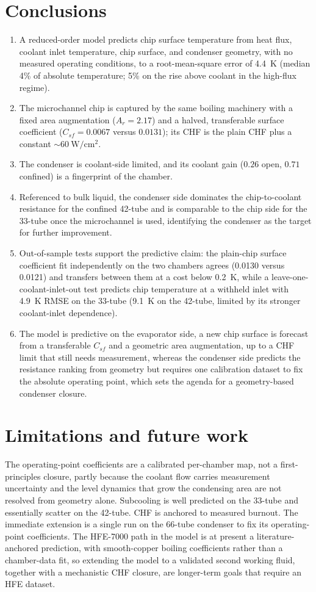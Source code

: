 \documentclass[11pt]{article}
\begin{document}
\section{Conclusions}
\begin{enumerate}
\item A reduced-order model predicts chip surface temperature from heat flux, coolant inlet
temperature, chip surface, and condenser geometry, with no measured operating conditions, to a
root-mean-square error of 4.4~K (median 4\% of absolute temperature; 5\% on the rise above coolant
in the high-flux regime).
\item The microchannel chip is captured by the same boiling machinery with a fixed area
augmentation ($A_r=2.17$) and a halved, transferable surface coefficient ($C_{sf}=0.0067$ versus
$0.0131$); its CHF is the plain CHF plus a constant $\sim\!60~\mathrm{W/cm^2}$.
\item The condenser is coolant-side limited, and its coolant gain ($0.26$ open, $0.71$ confined)
is a fingerprint of the chamber.
\item Referenced to bulk liquid, the condenser side dominates the chip-to-coolant resistance for
the confined 42-tube and is comparable to the chip side for the 33-tube once the microchannel is
used, identifying the condenser as the target for further improvement.
\item Out-of-sample tests support the predictive claim: the plain-chip surface coefficient fit
independently on the two chambers agrees (0.0130 versus 0.0121) and transfers between them at a cost
below 0.2~K, while a leave-one-coolant-inlet-out test predicts chip temperature at a withheld inlet
with 4.9~K RMSE on the 33-tube (9.1~K on the 42-tube, limited by its stronger coolant-inlet
dependence).
\item The model is predictive on the evaporator side, a new chip surface is forecast from a
transferable $C_{sf}$ and a geometric area augmentation, up to a CHF limit that still needs
measurement, whereas the condenser side predicts the resistance ranking from geometry but
requires one calibration dataset to fix the absolute operating point, which sets the agenda for a
geometry-based condenser closure.
\end{enumerate}

\section{Limitations and future work}
The operating-point coefficients are a calibrated per-chamber map, not a first-principles closure,
partly because the coolant flow carries measurement uncertainty and the level dynamics that grow
the condensing area are not resolved from geometry alone. Subcooling is well predicted on the
33-tube and essentially scatter on the 42-tube. CHF is anchored to measured burnout. The immediate
extension is a single run on the 66-tube condenser to fix its operating-point coefficients. The
HFE-7000 path in the model is at present a literature-anchored prediction, with smooth-copper boiling
coefficients rather than a chamber-data fit, so extending the model to a validated second working
fluid, together with a mechanistic CHF closure, are longer-term goals that require an HFE dataset.
\end{document}
